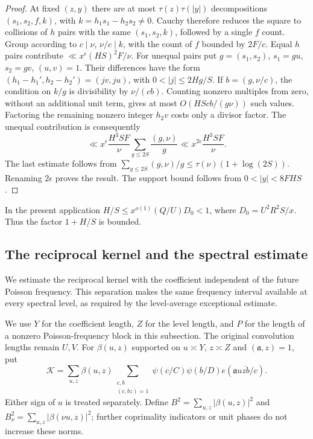 \begin{proof}
At fixed $(z,y)$ there are at most $\tau(z)\tau(|y|)$ decompositions
$(s_1,s_2,f,k)$, with $k=h_1s_1-h_2s_2\ne0$.
Cauchy therefore reduces the square to collisions of $h$ pairs with
the same $(s_1,s_2,k)$, followed by a single $f$ count.
Group according to $c\mid\nu$, $\nu/c\mid k$, with the count of $f$
bounded by $2F/c$. Equal $h$ pairs contribute
$\ll x^\epsilon(HS)^2F/\nu$.
For unequal pairs put $g=(s_1,s_2)$, $s_1=gu$, $s_2=gv$, $(u,v)=1$.
Their differences have the form $(h_1-h_1',h_2-h_2')=(jv,ju)$,
with $0<|j|\le2Hg/S$. If $b=(g,\nu/c)$, the condition on
$k/g$ is divisibility by $\nu/(cb)$. Counting nonzero multiples from
zero, without an additional unit term, gives at most
$O(HScb/(g\nu))$ such values. Factoring the remaining nonzero
integer $h_2v$ costs only a divisor factor. The unequal contribution
is consequently
\[
 \ll x^\epsilon\frac{H^3SF}{\nu}
             \sum_{g\le2S}\frac{(g,\nu)}g
 \ll x^{2\epsilon}\frac{H^3SF}{\nu}.
\]
The last estimate follows from
$\sum_{g\le2S}(g,\nu)/g\le\tau(\nu)(1+\log(2S))$.
Renaming $2\epsilon$ proves the result. The support bound follows from
$0<|y|<8FHS$.
\end{proof}

In the present application
$H/S\le x^{o(1)}(Q/U)D_0<1$, where
$D_0=U^2R^2S/x$. Thus the factor $1+H/S$ is bounded.

\subsection{The reciprocal kernel and the spectral estimate}

We estimate the reciprocal kernel with the coefficient independent
of the future Poisson frequency. This separation makes the same
frequency interval available at every spectral level, as required
by the level-average exceptional estimate.

We use $Y$ for the coefficient length, $Z$ for the level length,
and $P$ for the length of a nonzero Poisson-frequency block in this
subsection. The original convolution lengths remain $U,V$.
For $\beta(u,z)$ supported on $u\asymp Y$, $z\asymp Z$ and
$(\mathfrak{a},z)=1$, put
\begin{equation}
 \mathcal K=\sum_{u,z}\beta(u,z)
   \sum_{\substack{c,b\\(c,bz)=1}}
   \psi(c/C)\psi(b/D)e(\mathfrak{a}u\overline{zb}/c).
 \label{ana:kernel}
\end{equation}
Either sign of $u$ is treated separately. Define
$B^2=\sum_{u,z}|\beta(u,z)|^2$ and
$B_\nu^2=\sum_{u,z}|\beta(\nu u,z)|^2$; further coprimality
indicators or unit phases do not increase these norms.

